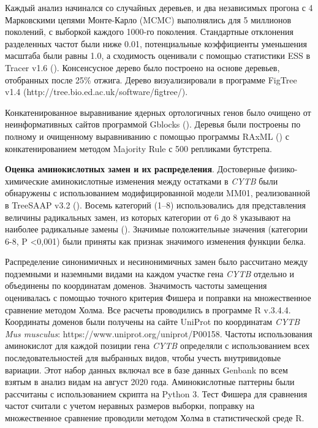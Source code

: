 Каждый анализ начинался со случайных деревьев, и два независимых прогона с 4 Марковскими цепями Монте-Карло (MCMC) выполнялись для 5 миллионов поколений, с выборкой каждого 1000-го поколения. Стандартные отклонения разделенных частот были ниже 0.01, потенциальные коэффициенты уменьшения масштаба были равны 1.0, а сходимость оценивали с помощью статистики ESS в Tracer v1.6 (\cite{Rambaut2014}). Консенсусное дерево было построено на основе деревьев, отобранных после 25\% отжига. Дерево визуализировали в программе FigTree v1.4 (http://tree.bio.ed.ac.uk/software/figtree/).

Конкатенированное выравнивание ядерных ортологичных генов было очищено от неинформативных сайтов программой Gblocks (\cite{Castresana2000}). Деревья были построены по полному и очищенному выравниванию с помощью программы RAxML (\cite{Stamatakis2014}) с конкатенированием методом Majority Rule с 500 репликами бутстрепа. 

\textbf{Оценка аминокислотных замен и их распределения}. Достоверные физико-химические аминокислотные изменения между остатками в \textit{CYTB} были обнаружены с использованием модифицированной модели MM01, реализованной в TreeSAAP v3.2 (\cite{Woolley2003}). Восемь категорий (1–8) использовались для представления величины радикальных замен, из которых категории от 6 до 8 указывают на наиболее радикальные замены (\cite{McClellan2001}). Значимые положительные значения (категории 6-8, P <0,001) были приняты как признак значимого изменения функции белка. 

Распределение синонимичных и несинонимичных замен было рассчитано между подземными и наземными видами на каждом участке гена \textit{CYTB} отдельно и объединены по координатам доменов. Значимость частоты замещения оценивалась с помощью точного критерия Фишера и поправки на множественное сравнение методом Холма. Все расчеты проводились в программе R v.3.4.4. Координаты доменов были получены на сайте UniProt по координатам \textit{CYTB} \textit{Mus musculus}: https://www.uniprot.org/uniprot/P00158. Частоты использования аминокислот для каждой позиции гена \textit{CYTB} определяли с использованием всех последовательностей для выбранных видов, чтобы учесть внутривидовые вариации. Этот набор данных включал все в базе данных Genbank по всем взятым в анализ видам на август 2020 года. Аминокислотные паттерны были рассчитаны с использованием скрипта на Python 3. Тест Фишера для сравнения частот считали с учетом неравных размеров выборки, поправку на множественное сравнение проводили методом Холма в статистической среде R.

